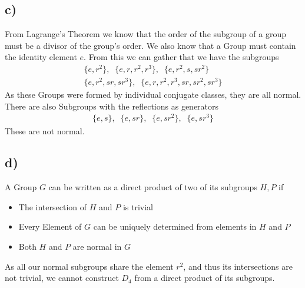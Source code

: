 \documentclass[]{scrartcl}
\begin{document}
\subsection{c)}
From Lagrange's Theorem we know that the order of the subgroup of a group must be a divisor of the group's order. We also know that a Group must contain the identity element $e$. From this we can gather that we have the subgroups
\begin{gather*}
	\{e,r^2\},\;\; \{e,r,r^2,r^3\},\;\;\{e,r^2,s,sr^2\}\\
	\{e,r^2,sr,sr^3\},\;\;\{e,r,r^2,r^3,sr,sr^2,sr^3\}
\end{gather*}
As these Groups were formed by individual conjugate classes, they are all normal. There are also Subgroups with the reflections as generators
\begin{gather*}
	\{e,s\},\;\;\{e,sr\},\;\;\{e,sr^2\},\;\;\{e,sr^3\}
\end{gather*}
These are not normal.

\subsection{d)}
A Group $G$ can be written as a direct product of two of its subgroups $H, P$ if
\begin{itemize}
	\item The intersection of $H$ and $P$ is trivial\\
	\item Every Element of $G$ can be uniquely determined from elements in $H$ and $P$
	\item Both $H$ and $P$ are normal in $G$
\end{itemize}
As all our normal subgroups share the element $r^2$, and thus its intersections are not trivial, we cannot construct $D_4$ from a direct product of its subgroups.
\end{document}
